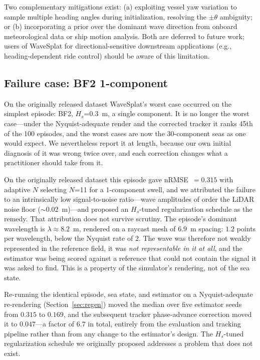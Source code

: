 Two complementary mitigations exist: (a) exploiting vessel yaw
variation to sample multiple heading angles during initialization,
resolving the $\pm\theta$ ambiguity; or (b) incorporating a
prior over the dominant wave direction from onboard meteorological
data or ship motion analysis.  Both are deferred to future work;
users of WaveSplat for directional-sensitive downstream applications
(e.g., heading-dependent ride control) should be aware of this
limitation.

\subsection{Failure case: BF2 1-component}
\label{sec:bf2case}

On the originally released dataset WaveSplat's worst case occurred on the
simplest episode: BF2, $H_s$=0.3~m, a single component.  It is no longer
the worst case---under the Nyquist-adequate render and the corrected
tracker it ranks 45th of the 100 episodes, and the worst cases are now the
30-component seas as one would expect.  We nevertheless report it at
length, because our own initial diagnosis of it was wrong twice over, and
each correction changes what a practitioner should take from it.

On the originally released dataset this episode gave nRMSE~$=0.315$
with adaptive $N$ selecting $N$=11 for a 1-component swell, and we
attributed the failure to an intrinsically low signal-to-noise
ratio---wave amplitudes of order the LiDAR noise floor
($\sim$0.02~m)---and proposed an $H_s$-tuned regularization schedule
as the remedy.  That attribution does not survive scrutiny.  The
episode's dominant wavelength is $\lambda \approx 8.2$~m, rendered on
a raycast mesh of $6.9$~m spacing: $1.2$ points per wavelength, below
the Nyquist rate of $2$.  The wave was therefore not weakly
represented in the reference field, it was \emph{not representable in
it at all}, and the estimator was being scored against a reference
that could not contain the signal it was asked to find.  This is a
property of the simulator's rendering, not of the sea state.

Re-running the identical episode, sea state, and estimator on a
Nyquist-adequate re-rendering (Section~\ref{sec:regen}) moved the
median over five estimator seeds from $0.315$ to $0.169$, and the
subsequent tracker phase-advance correction moved it to
$\mathbf{0.047}$---a factor of $6.7$ in total, entirely from the
evaluation and tracking pipeline rather than from any change to the
estimator's design.  The $H_s$-tuned regularization schedule we
originally proposed addresses a problem that does not exist.


